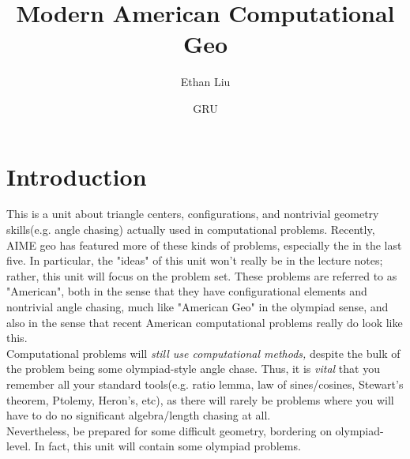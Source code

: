\documentclass[mast]{lucky}
\begin{document}
\title{Modern American Computational Geo}
\author{Ethan Liu}
\date{GRU}
\maketitle
\section{Introduction}
This is a unit about triangle centers, configurations, and nontrivial geometry skills(e.g. angle chasing) actually used in computational problems. Recently, AIME geo has featured more of these kinds of problems, especially the in the last five. In particular, the "ideas" of this unit won't really be in the lecture notes; rather, this unit will focus on the problem set. These problems are referred to as "American", both in the sense that they have configurational elements and nontrivial angle chasing, much like "American Geo" in the olympiad sense, and also in the sense that recent American computational problems really do look like this.\\
Computational problems will \textit{still use computational methods,} despite the bulk of the problem being some olympiad-style angle chase. Thus, it is \textit{vital} that you remember all your standard tools(e.g. ratio lemma, law of sines/cosines, Stewart's theorem, Ptolemy, Heron's, etc), as there will rarely be problems where you will have to do no significant algebra/length chasing at all.\\
Nevertheless, be prepared for some difficult geometry, bordering on olympiad-level. In fact, this unit will contain some olympiad problems.
\end{document}
